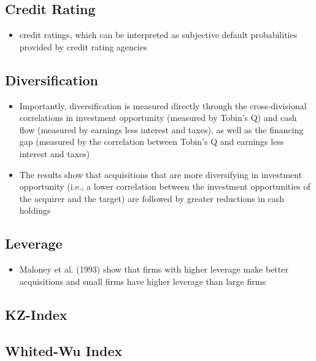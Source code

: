 \documentclass[12pt]{article}
\begin{document}
\subsection{Credit Rating}

    \begin{itemize}
        \item credit ratings, which can be interpreted as subjective default probabilities provided by credit rating agencies \citep{Campbell2008}
    \end{itemize}
\subsection{Diversification}

    \begin{itemize}
        \item Importantly, diversification is measured directly through the cross-divisional correlations in investment opportunity (measured by Tobin’s Q) and cash flow (measured by earnings less interest and taxes), as well as the financing gap (measured by the correlation between Tobin’s Q and earnings less interest and taxes) \citep{DUCHIN2010}
        \item The results show that acquisitions that are more diversifying in investment opportunity (i.e., a lower correlation between the investment opportunities of the acquirer and the target) are followed by greater reductions in cash holdings \citep{DUCHIN2010}
    \end{itemize}
\subsection{Leverage}

    \begin{itemize}
        \item Maloney et al. (1993) show that firms with higher leverage make better acquisitions and small firms have higher leverage than large firms \citep{Moeller2004}  
    \end{itemize}

\subsection{KZ-Index}


\subsection{Whited-Wu Index}
\end{document}
